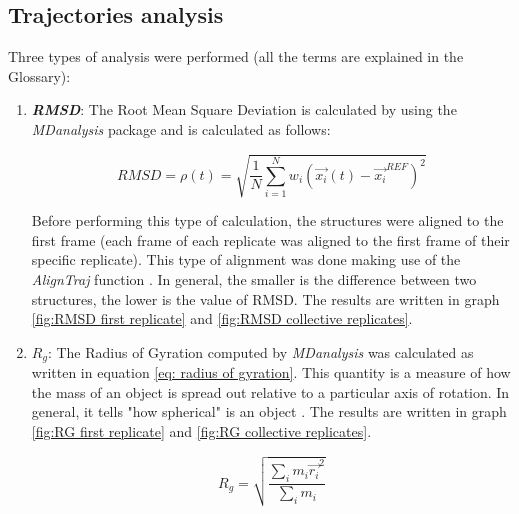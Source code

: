 \subsection{Trajectories analysis} \label{chap: trajectory analysis}

Three types of analysis were performed (all the terms are explained in the Glossary): %

\begin{enumerate}
    \item \textbf{\textit{RMSD}}: The Root Mean Square Deviation is calculated by using the \textit{MDanalysis} package
    \cite{gowersMDAnalysisPythonPackage2016}
    and is calculated as follows:

    \begin{equation} \label{eq: RMSD}
        RMSD = \rho(t) = \sqrt{\frac{1}{N} \sum_{i=1}^N{w_i \left(\vec{x_i}(t) - \vec{x_i}^{REF}\right)^2}}
    \end{equation}

    Before performing this type of calculation, the structures were aligned to the first frame (each frame of each replicate was aligned to the first frame of their specific replicate). This type of alignment was done making use of the \textit{AlignTraj} function
    \cite{gowersMDAnalysisPythonPackage2016}
    . In general, the smaller is the difference between two structures, the lower is the value of RMSD. The results are written in graph \ref{fig:RMSD first replicate} and \ref{fig:RMSD collective replicates}.
    


    \item \textbf{$R_g$}: The Radius of Gyration computed by \textit{MDanalysis} was calculated as written in equation \ref{eq: radius of gyration}. This quantity is a measure of how the mass of an object is spread out relative to a particular axis of rotation. In general, it tells "how spherical" is an object
    \cite{gowersMDAnalysisPythonPackage2016,tuckermanStatisticalMechanicsTheory2015}
    . The results are written in graph \ref{fig:RG first replicate} and \ref{fig:RG collective replicates}.
    

    \begin{equation} \label{eq: radius of gyration}
        R_g = \sqrt{\frac{\sum_i{m_i \vec{r_i}^2}}{\sum_i{m_i}}}    
    \end{equation}



\end{enumerate}
